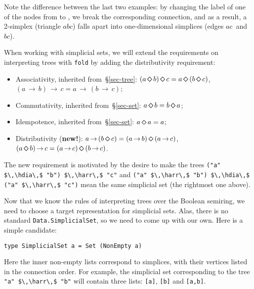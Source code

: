 \documentclass[english,submission]{programming}
\newcommand{\code}[1]{\lstinline[mathescape]|#1|}
\newcommand{\hcode}[1]{{\color{darkblue} \lstinline[keywordstyle={}]|#1|}} %
\newcommand{\hdia}{\,\text{\raisebox{-0.2mm}{\Large\color{darkblue} $\diamond$}}\,}
\newcommand{\harr}{\,\text{\color{darkblue} $\rightarrow$}\,}
\newcommand{\zero}{\raisebox{-0.2mm}{\textcircled{0}}\xspace}
\newcommand{\one}{\raisebox{-0.2mm}{\textcircled{1}}\xspace}
\newcommand{\dia}{\,\text{\raisebox{-0.3mm}{\Large $\diamond$}}\,}
\newcommand{\arr}{\,\text{$\rightarrow$}\,}
\begin{document}
\vspace{5mm}
\hfill\hspace{-4mm}\hfill
\vspace{5mm}

\noindent
Note the difference between the last two examples: by changing the label of one
of the nodes from \one to \zero, we break the corresponding connection,
and as a result, a 2-simplex (triangle $\textit{abc}$) falls apart into
one-dimensional simplices (edges $\textit{ac}$~and~$\textit{bc}$).

When working with simplicial sets, we will extend the requirements on
interpreting trees with \hcode{fold} by adding the distributivity requirement:

\begin{itemize}
    \item Associativity, inherited from~\S\ref{sec-tree}:
          $(a \dia b) \dia c = a \dia (b \dia c)$,
          $(a \arr b) \arr c = a \arr (b \arr c)$;
    \item Commutativity, inherited from~\S\ref{sec-set}:
          $a \dia b = b \dia a$;
    \item Idempotence, inherited from~\S\ref{sec-set}:
          $a \dia a = a$;
    \item Distributivity (\textbf{\color{darkblue}new!}):
          $a \arr (b \dia c) = (a \arr b) \dia (a \arr c)$,
          $(a \dia b) \arr c = (a \arr c) \dia (b \arr c)$.
\end{itemize}

\noindent
The new requirement is motivated by the desire to make the trees
\code{("a" $\,\hdia\,$ "b") $\,\harr\,$ "c"} and
\code{("a" $\,\harr\,$ "b") $\,\hdia\,$ ("a" $\,\harr\,$ "c")} mean the same
simplicial set (the rightmost one above).

Now that we know the rules of interpreting trees over the Boolean semiring, we
need to choose a target representation for simplicial sets. Alas, there is no
standard \code{Data.SimplicialS}\code{et}, so we need to come up with our own.
Here is a simple candidate:

\begin{lstlisting}
type SimplicialSet a = Set (NonEmpty a)
\end{lstlisting}

\noindent
Here the inner non-empty lists correspond to simplices, with their vertices
listed in the connection order. For example, the simplicial set corresponding to
the tree \code{"a" $\,\harr\,$ "b"} will contain three lists: \code{[a]},
\code{[b]} and \code{[a,b]}.
\end{document}
